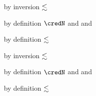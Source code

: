 {\begin{lamportproof*}
    \begin{pfproof}
        \begin{pfproof}
          by inversion $\lesssim$
        \end{pfproof}
        \begin{pfproof}
          by definition $\credN$ and  and \pfih
        \end{pfproof}
      \qedstep
        \begin{pfproof}
          by definition $\lesssim$
        \end{pfproof}
    \end{pfproof}

    \begin{pfproof}
        \begin{pfproof}
          by inversion $\lesssim$
        \end{pfproof}
        \begin{pfproof}
          by definition $\credN$ and  and \pfih
        \end{pfproof}
      \qedstep
        \begin{pfproof}
          by definition $\lesssim$
        \end{pfproof}
    \end{pfproof}


\end{lamportproof*}}
